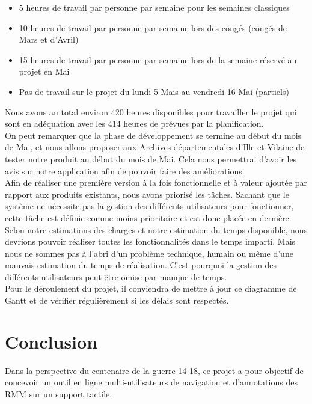 \documentclass[a4paper]{article}
\begin{document}
\begin{itemize}
\item 5 heures de travail par personne par semaine pour les semaines classiques
\item 10 heures de travail par personne par semaine lors des congés (congés de Mars et d'Avril)
\item 15 heures de travail par personne par semaine lors de la semaine réservé au projet en Mai
\item Pas de travail sur le projet du lundi 5 Mais au vendredi 16 Mai (partiels)
\end{itemize}

	Nous avons au total environ 420 heures disponibles pour travailler le projet qui sont en adéquation avec les 414 heures de prévues par la planification.\\

	On peut remarquer que la phase de développement se termine au début du mois de Mai, et nous allons proposer aux Archives départementales d’Ille-et-Vilaine de tester notre produit au début du mois de Mai. Cela nous permettrai d'avoir les avis sur notre application afin de pouvoir faire des améliorations.\\

	Afin de réaliser une première version à la fois fonctionnelle et à valeur ajoutée par rapport aux produits existants, nous avons priorisé les tâches. Sachant que le système ne nécessite pas la gestion des différents utilisateurs pour fonctionner, cette tâche est définie comme moins prioritaire et est donc placée en dernière. Selon notre estimations des charges et notre estimation du temps disponible, nous devrions pouvoir réaliser toutes les fonctionnalités dans le temps imparti. Mais nous ne sommes pas à l'abri d'un problème technique, humain ou même d'une mauvais estimation du temps de réalisation. C'est pourquoi la gestion des différents utilisateurs peut être omise par manque de temps.\\
	
	Pour le déroulement du projet, il conviendra de mettre à jour ce diagramme de Gantt et de vérifier régulièrement si les délais sont respectés.

\newpage
{}
{}
\section*{Conclusion}

	Dans la perspective du centenaire de la guerre 14-18, ce projet a pour objectif de concevoir un outil en ligne multi-utilisateurs de navigation et d’annotations des RMM sur un support tactile.\\
	
\end{document}
